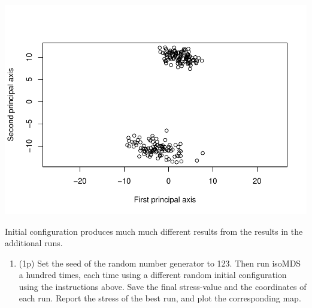 \documentclass[
]{article}
\newenvironment{Shaded}{\begin{snugshade}}{\end{snugshade}}
\newcommand{\DataTypeTok}[1]{\textcolor[rgb]{0.13,0.29,0.53}{#1}}
\newcommand{\DecValTok}[1]{\textcolor[rgb]{0.00,0.00,0.81}{#1}}
\newcommand{\KeywordTok}[1]{\textcolor[rgb]{0.13,0.29,0.53}{\textbf{#1}}}
\newcommand{\NormalTok}[1]{#1}
\newcommand{\OperatorTok}[1]{\textcolor[rgb]{0.81,0.36,0.00}{\textbf{#1}}}
\newcommand{\OtherTok}[1]{\textcolor[rgb]{0.56,0.35,0.01}{#1}}
\newcommand{\StringTok}[1]{\textcolor[rgb]{0.31,0.60,0.02}{#1}}
\providecommand{\tightlist}{%
  \setlength{\itemsep}{0pt}\setlength{\parskip}{0pt}}
\begin{document}
\begin{Shaded}
\end{Shaded}

\includegraphics{P052020_Substructure_files/figure-latex/9th-3.pdf}

Initial configuration produces much much different results from the
results in the additional runs.

\begin{enumerate}
\def\labelenumi{\arabic{enumi}.}
\setcounter{enumi}{9}
\tightlist
\item
  (1p) Set the seed of the random number generator to 123. Then run
  isoMDS a hundred times, each time using a different random initial
  configuration using the instructions above. Save the final
  stress-value and the coordinates of each run. Report the stress of the
  best run, and plot the corresponding map.
\end{enumerate}
\end{document}
